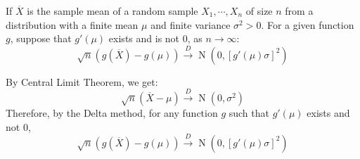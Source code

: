 \documentclass{huhtakm-template-book-v2}
\DeclareMathOperator{\N}{N}
\begin{document}
\begin{cor}
	\label{Chapter 1 (Corollary) CLT for functions of random variables}
	If $\overline{X}$ is the sample mean of a random sample $X_{1},\cdots,X_{n}$ of size $n$ from a distribution with a finite mean $\mu$ and finite variance $\sigma^{2}>0$. For a given function $g$, suppose that $g'(\mu)$ exists and is not $0$, as $n\to\infty$:
	\begin{equation*}
		\sqrt{n}(g(\overline{X})-g(\mu))\xrightarrow{D}\N(0,[g'(\mu)\sigma]^{2})
	\end{equation*}  
\end{cor}
\begin{proofing}
	By Central Limit Theorem, we get:
	\begin{equation*}
		\sqrt{n}(\overline{X}-\mu)\xrightarrow{D}\N(0,\sigma^{2})
	\end{equation*}
	Therefore, by the Delta method, for any function $g$ such that $g'(\mu)$ exists and not $0$,
	\begin{equation*}
		\sqrt{n}(g(\overline{X})-g(\mu))\xrightarrow{D}\N(0,[g'(\mu)\sigma]^{2})
	\end{equation*}
\end{proofing}
\end{document}
